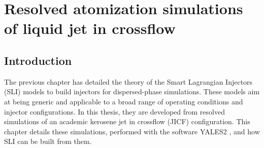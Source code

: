 \chapter{Resolved atomization simulations of liquid jet in crossflow}

\label{ch5:jicf_resolved_simulations}

%
%
%	
%	
%	
%	
%	
%	
%	
%		
%			
%			
%	
%		
%	
%		
%			
%		
%
%

\section{Introduction}

The previous chapter has detailed the theory of the Smart Lagrangian Injectors (SLI) models to build injectors for dispersed-phase simulations. These models aim at being generic and applicable to a broad range of operating conditions
and injector configurations. In this thesis, they are developed from resolved simulations of an academic kerosene jet in crossflow (JICF) configuration. This chapter details these simulations, performed with the software YALES2 , and how SLI can be built from them. %

